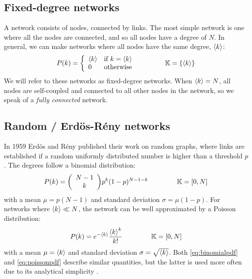 \subsection{Fixed-degree networks}
\noindent A network consists of nodes, connected by links. The most simple network is one where all the nodes are connected, and so all nodes have a degree of $N$. In general, we can make networks where all nodes have the same degree, ${\langle k\rangle}$:
\begin{align}
P(k) = \left\{\begin{array}{ll}\kmean & \text{if } k=\kmean \\0 & \text{otherwise}\end{array}\right. \hspace{15mm} \K = \{ \kmean \} \label{eq:diracpdf}
\end{align}
We will refer to these networks as fixed-degree networks. When ${\langle k\rangle} = N$, all nodes are self-coupled and connected to all other nodes in the network, so we speak of a \textsl{fully connected} network. 


\subsection{Random / Erd{\"o}s-R{\'e}ny networks}
In 1959 Erd{\"o}s and R{\'e}ny published their work on random graphs\cite{RandomGraphs1959}, where links are established if a random uniformly distributed number is higher than a threshold $p$. The degrees follow a binomial distribution: 
\begin{align}
P(k)=\left(\begin{array}{c}N-1 \\ k\end{array}\right) p^{k}(1-p)^{N-1-k}  \hspace{15mm} \K = [0,N] \label{eq:binomialpdf}
\end{align}
with a mean $\mu = p(N-1)$ and standard deviation $\sigma = \mu(1-p)$. For networks where ${\langle k\rangle} \ll N$, the network can be well approximated by a Poisson distribution:
\begin{align}
P(k) = e^{-\kmean} \frac{\kmean^{k}}{k !} \hspace{15mm} \K = [0,N] \label{eq:poissonpdf}
\end{align}
with a mean $\mu = {\langle k\rangle}$ and standard deviation $\sigma = \sqrt{{\langle k\rangle}}$. Both \eqref{eq:binomialpdf} and \eqref{eq:poissonpdf} describe similar quantities, but the latter is used more often due to its analytical simplicity \cite{BarabasiNetworkBook2016}.

